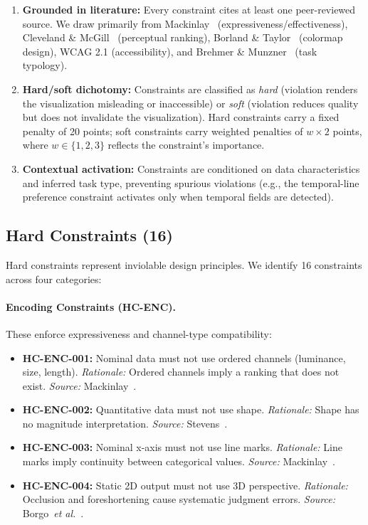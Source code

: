\documentclass[journal]{vgtc}
\newcommand{\eg}{e.g.}
\newcommand{\etal}{\textit{et al.}}
\begin{document}
\begin{enumerate}
\item \textbf{Grounded in literature:} Every constraint cites at least one peer-reviewed source.
We draw primarily from Mackinlay~\cite{mackinlay1986automating} (expressiveness/effectiveness), Cleveland \& McGill~\cite{cleveland1984graphical} (perceptual ranking), Borland \& Taylor~\cite{borland2007rainbow} (colormap design), WCAG 2.1 (accessibility), and Brehmer \& Munzner~\cite{brehmer2013multi} (task typology).

\item \textbf{Hard/soft dichotomy:} Constraints are classified as \textit{hard} (violation renders the visualization misleading or inaccessible) or \textit{soft} (violation reduces quality but does not invalidate the visualization).
Hard constraints carry a fixed penalty of 20 points; soft constraints carry weighted penalties of $w \times 2$ points, where $w \in \{1, 2, 3\}$ reflects the constraint's importance.

\item \textbf{Contextual activation:} Constraints are conditioned on data characteristics and inferred task type, preventing spurious violations (\eg{}, the temporal-line preference constraint activates only when temporal fields are detected).
\end{enumerate}

\subsection{Hard Constraints (16)}

Hard constraints represent inviolable design principles.
We identify 16 constraints across four categories:

\paragraph{Encoding Constraints (HC-ENC).}
These enforce expressiveness and channel-type compatibility:
\begin{itemize}
\item \textbf{HC-ENC-001:} Nominal data must not use ordered channels (luminance, size, length). \textit{Rationale:} Ordered channels imply a ranking that does not exist. \textit{Source:} Mackinlay~\cite{mackinlay1986automating}.
\item \textbf{HC-ENC-002:} Quantitative data must not use shape. \textit{Rationale:} Shape has no magnitude interpretation. \textit{Source:} Stevens~\cite{stevens1946theory}.
\item \textbf{HC-ENC-003:} Nominal x-axis must not use line marks. \textit{Rationale:} Line marks imply continuity between categorical values. \textit{Source:} Mackinlay~\cite{mackinlay1986automating}.
\item \textbf{HC-ENC-004:} Static 2D output must not use 3D perspective. \textit{Rationale:} Occlusion and foreshortening cause systematic judgment errors. \textit{Source:} Borgo~\etal{}~\cite{borgo2012glyph}.
\end{itemize}
\end{document}
